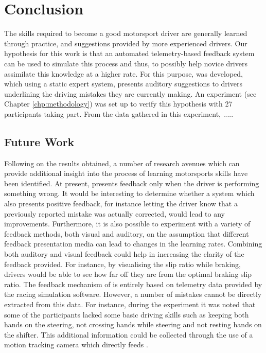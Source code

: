 \chapter{Conclusion}
The skills required to become a good motorsport driver are generally learned through practice, and suggestions provided by more experienced drivers. Our hypothesis for this work is that an automated telemetry-based feedback system can be used to simulate this process and thus, to possibly help novice drivers assimilate this knowledge at a higher rate. For this purpose, \methodname was developed, which using a static expert system, presents auditory suggestions to drivers underlining the driving mistakes they are currently making. An experiment (see Chapter \ref{chp:methodology}) was set up to verify this hypothesis with 27 participants taking part. From the data gathered in this experiment, .....

\section{Future Work}
Following on the results obtained, a number of research avenues which can provide additional insight into the process of learning motorsports skills have been identified. At present, \methodname presents feedback only when the driver is performing something wrong. It would be interesting to determine whether a system which also presents positive feedback, for instance letting the driver know that a previously reported mistake was actually corrected, would lead to any improvements. Furthermore, it is also possible to experiment with a variety of feedback methods, both visual and auditory, on the assumption that different feedback presentation media can lead to changes in the learning rates. Combining both auditory and visual feedback could help in increasing the clarity of the feedback provided. For instance, by visualising the slip ratio while braking, drivers would be able to see how far off they are from the optimal braking slip ratio. The feedback mechanism of \methodname is entirely based on telemetry data provided by the racing simulation software. However, a number of mistakes cannot be directly extracted from this data. For instance, during the experiment it was noted that some of the participants lacked some basic driving skills such as keeping both hands on the steering, not crossing hands while steering and not resting hands on the shifter. This additional information could be collected through the use of a motion tracking camera which directly feeds \methodname.   

